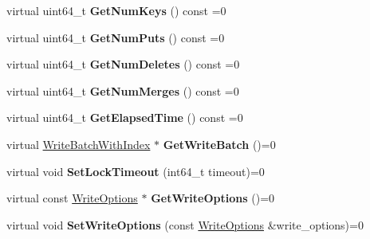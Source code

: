 \begin{DoxyCompactItemize}
\item 
virtual uint64\+\_\+t {\bfseries Get\+Num\+Keys} () const =0\hypertarget{classrocksdb_1_1Transaction_a1646a67db6edbfff29ed1479fc4f2e22}{}\label{classrocksdb_1_1Transaction_a1646a67db6edbfff29ed1479fc4f2e22}

\item 
virtual uint64\+\_\+t {\bfseries Get\+Num\+Puts} () const =0\hypertarget{classrocksdb_1_1Transaction_a1b5e082bd35ee4ad9450e9531628ed60}{}\label{classrocksdb_1_1Transaction_a1b5e082bd35ee4ad9450e9531628ed60}

\item 
virtual uint64\+\_\+t {\bfseries Get\+Num\+Deletes} () const =0\hypertarget{classrocksdb_1_1Transaction_a5485faa6943916bc27da8f777058c57a}{}\label{classrocksdb_1_1Transaction_a5485faa6943916bc27da8f777058c57a}

\item 
virtual uint64\+\_\+t {\bfseries Get\+Num\+Merges} () const =0\hypertarget{classrocksdb_1_1Transaction_ad9f4cc199b2e77c28aa305bdf563eaa3}{}\label{classrocksdb_1_1Transaction_ad9f4cc199b2e77c28aa305bdf563eaa3}

\item 
virtual uint64\+\_\+t {\bfseries Get\+Elapsed\+Time} () const =0\hypertarget{classrocksdb_1_1Transaction_a264b9ba81d110897f3d63b7053cac822}{}\label{classrocksdb_1_1Transaction_a264b9ba81d110897f3d63b7053cac822}

\item 
virtual \hyperlink{classrocksdb_1_1WriteBatchWithIndex}{Write\+Batch\+With\+Index} $\ast$ {\bfseries Get\+Write\+Batch} ()=0\hypertarget{classrocksdb_1_1Transaction_ab356c47de27b08c15ef78dea6abec680}{}\label{classrocksdb_1_1Transaction_ab356c47de27b08c15ef78dea6abec680}

\item 
virtual void {\bfseries Set\+Lock\+Timeout} (int64\+\_\+t timeout)=0\hypertarget{classrocksdb_1_1Transaction_a8a1df2ef2be87fece6ec27637bab69b7}{}\label{classrocksdb_1_1Transaction_a8a1df2ef2be87fece6ec27637bab69b7}

\item 
virtual const \hyperlink{structrocksdb_1_1WriteOptions}{Write\+Options} $\ast$ {\bfseries Get\+Write\+Options} ()=0\hypertarget{classrocksdb_1_1Transaction_aaf457f051f48015f57abf84e35e966d7}{}\label{classrocksdb_1_1Transaction_aaf457f051f48015f57abf84e35e966d7}

\item 
virtual void {\bfseries Set\+Write\+Options} (const \hyperlink{structrocksdb_1_1WriteOptions}{Write\+Options} \&write\+\_\+options)=0\hypertarget{classrocksdb_1_1Transaction_a99be1011b1b2867e3d0959a88ac2f5ab}{}\label{classrocksdb_1_1Transaction_a99be1011b1b2867e3d0959a88ac2f5ab}


\end{DoxyCompactItemize}
